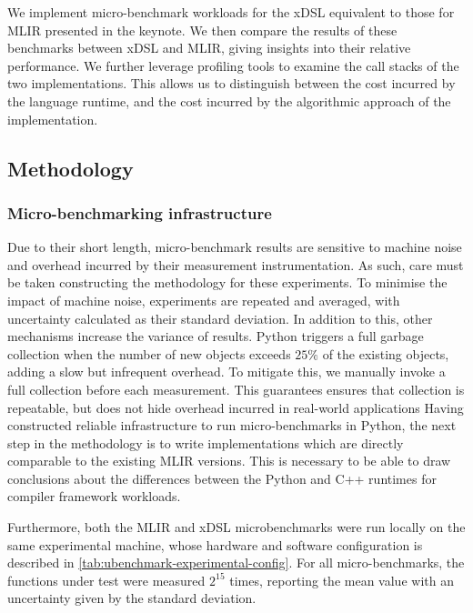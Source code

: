 We implement micro-benchmark workloads for the xDSL equivalent to those for MLIR presented in the keynote. %
We then compare the results of these benchmarks between xDSL and MLIR, giving insights into their relative performance. We further leverage profiling tools to examine the call stacks of the two implementations. This allows us to distinguish between the cost incurred by the language runtime, and the cost incurred by the algorithmic approach of the implementation.





\subsection{Methodology}
\label{ssec:ubenchmark-methodology}

\subsubsection{Micro-benchmarking infrastructure}
\label{sssec:ubenchmark-methodology-infra}

Due to their short length, micro-benchmark results are sensitive to machine noise and overhead incurred by their measurement instrumentation. As such, care must be taken constructing the methodology for these experiments.
To minimise the impact of machine noise, experiments are repeated and averaged, with uncertainty calculated as their standard deviation. In addition to this, other mechanisms increase the variance of results.
Python triggers a full garbage collection when the number of new objects exceeds $25\%$ of the existing objects, adding a slow but infrequent overhead. To mitigate this, we manually invoke a full collection before each measurement. This guarantees ensures that collection is repeatable, but does not hide overhead incurred in real-world applications
Having constructed reliable infrastructure to run micro-benchmarks in Python, the next step in the methodology is to write implementations which are directly comparable to the existing MLIR versions. This is necessary to be able to draw conclusions about the differences between the Python and C++ runtimes for compiler framework workloads.

Furthermore, both the MLIR and xDSL microbenchmarks were run locally on the same experimental machine, whose hardware and software configuration is described in \autoref{tab:ubenchmark-experimental-config}. For all micro-benchmarks, the functions under test were measured $2^{15}$ times, reporting the mean value with an uncertainty given by the standard deviation.

